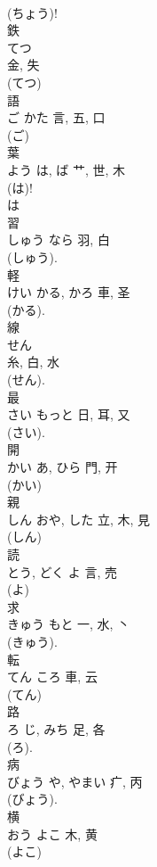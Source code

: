 \documentclass[8pt]{extreport}
\begin{document}
\begin{CJK}{UTF8}{min}
\\	(ちょう)!
\\	鉄	
\\	てつ	
\\	金, 失	
\\	(てつ) 
\\	語	
\\	ご	かた	言, 五, 口	
\\	(ご) 
\\	葉	
\\	よう	は, ば	艹, 世, 木	
\\	(は)!
\\	は 
\\	習	
\\	しゅう	なら	羽, 白	
\\	(しゅう). 
\\	軽	
\\	けい	かる, かろ	車, 圣	
\\	(かる). 
\\	線	
\\	せん	
\\	糸, 白, 水	
\\	(せん). 
\\	最	
\\	さい	もっと	日, 耳, 又	
\\	(さい). 
\\	開	
\\	かい	あ, ひら	門, 开	
\\	(かい) 
\\	親	
\\	しん	おや, した	立, 木, 見	
\\	(しん) 
\\	読	
\\	とう, どく	よ	言, 売	
\\	(よ) 
\\	求	
\\	きゅう	もと	一, 水, 丶	
\\	(きゅう).	
\\	転	
\\	てん	ころ	車, 云	
\\	(てん) 
\\	路	
\\	ろ	じ, みち	足, 各	
\\	(ろ). 
\\	病	
\\	びょう	や, やまい	疒, 丙	
\\	(びょう). 
\\	横	
\\	おう	よこ	木, 黄	
\\	(よこ) 

\end{CJK}
\end{document}
